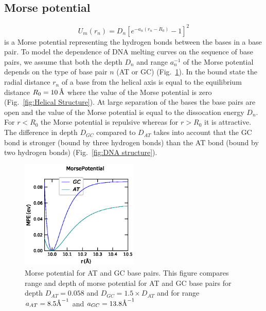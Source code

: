 \documentclass[12pt,masters,final]{UTRGVthesis}
\begin{document}
\subsection{Morse potential}
%
 \begin{equation} \label{morse}
    U_m\left(r_n\right) = D_n \left[e^{-a_n \left(r_n - R_0\right)} - 1 \right]^2
  \end{equation} 
  is a Morse potential representing the hydrogen bonds between the bases in a base pair.
  To model the
  dependence of DNA melting curves on the sequence of base pairs, we assume that both  the
  depth $D_n$ and range $a_n^{-1}$ of the Morse potential  depends on the type of base pair $n$ (AT or GC)
  (Fig.~\ref{fig:Morse Potential}). In the bound state the radial distance $r_n$ of a base from the helical axis is equal to the
  equilibrium distance $R_0 = 10 \, \text{\normalfont\AA}$ where the value of the Morse potential is zero
  (Fig.~\ref{fig:Helical Structure}). At large separation of the bases
  the base pairs are open and the value of the Morse potential is equal to the dissocation energy $D_{n}$.
  For $r<R_{0}$ the Morse potential is repulsive whereas for $r>R_{0}$ it is attractive. 
  The difference in depth $D_{GC}$ compared to $D_{AT}$ takes into account that the GC bond is stronger
  (bound by three hydrogen bonds) than the AT bond (bound by two hydrogen bonds)  (Fig.~\ref{fig:DNA structure}).
\begin{figure}[!h]
  \includegraphics[width=0.5\textwidth]{Morse_Potential_GC_AT.eps}
  \caption{\small Morse potential for AT and GC base pairs. This figure compares range and depth of morse potential for AT and GC base pairs for depth $D_{AT}=0.058$ and $D_{GC}=1.5\times D_{AT}$ and for range $a_{AT}=8.5\text{\normalfont\AA}^{-1} $ and $a_{GC}=13.8\text{\normalfont\AA}^{-1}$}
\label{fig:Morse Potential}
\end{figure}
%
\newpage
\end{document}

